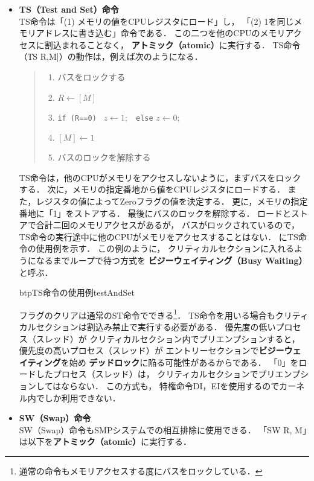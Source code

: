 \begin{itemize}
\item {\bf TS（Test and Set）命令} \\
TS命令は「(1) メモリの値をCPUレジスタにロード」し，
「(2) 1を同じメモリアドレスに書き込む」命令である．
この二つを他のCPUのメモリアクセスに割込まれることなく，
{\bf アトミック（atomic）}に実行する．
TS命令（\|TS R,M|）の動作は，例えば次のようになる．

\begin{quote}
\begin{enumerate}
\item バスをロックする
\item $R \leftarrow [M]$
\item {\tt if (R==0) } $z \leftarrow 1;$ {\tt ~else} $z \leftarrow 0;$
\item $[M] \leftarrow 1$
\item バスのロックを解除する
\end{enumerate}
\end{quote}

TS命令は，他のCPUがメモリをアクセスしないように，まずバスをロックする．
次に，メモリの指定番地から値をCPUレジスタにロードする．
また，レジスタの値によってZeroフラグの値を決定する．
更に，メモリの指定番地に「1」をストアする．
最後にバスのロックを解除する．
ロードとストアで合計二回のメモリアクセスがあるが，
バスがロックされているので，
TS命令の実行途中に他のCPUがメモリをアクセスすることはない．
にTS命令の使用例を示す．
この例のように，
クリティカルセクションに入れるようになるまでループで待つ方式を
{\bf ビジーウェイティング（Busy Waiting）}と呼ぶ．

\begin{myfig}{btp}{TS命令の使用例}{testAndSet}

\end{myfig}

フラグのクリアは通常のST命令でできる\footnote{
通常の命令もメモリアクセスする度にバスをロックしている．}．
TS命令を用いる場合もクリティカルセクションは割込み禁止で実行する必要がある．
優先度の低いプロセス（スレッド）が
クリティカルセクション内でプリエンプションすると，
優先度の高いプロセス（スレッド）が
エントリーセクションで{\bf ビジーウェイティング}を始め
{\bf デッドロック}に陥る可能性があるからである．
「0」をロードしたプロセス（スレッド）は，
クリティカルセクションでプリエンプションしてはならない．
この方式も，
特権命令DI，EIを使用するのでカーネル内でしか利用できない．

\item {\bf SW（Swap）命令} \\
SW（Swap）命令もSMPシステムでの相互排除に使用できる．
「SW  R, M」は以下を{\bf アトミック（atomic）}に実行する．


\end{itemize}
